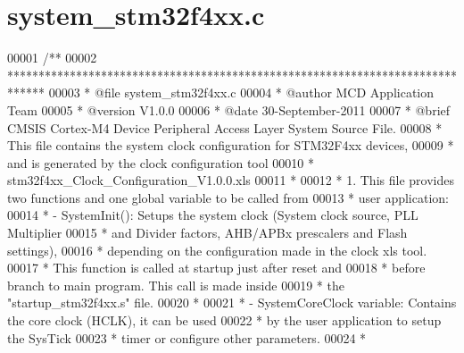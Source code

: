 \section{system\+\_\+stm32f4xx.\+c}
\label{system__stm32f4xx_8c_source}

\begin{DoxyCode}
00001 \textcolor{comment}{/**}
00002 \textcolor{comment}{  ******************************************************************************}
00003 \textcolor{comment}{  * @file    system\_stm32f4xx.c}
00004 \textcolor{comment}{  * @author  MCD Application Team}
00005 \textcolor{comment}{  * @version V1.0.0}
00006 \textcolor{comment}{  * @date    30-September-2011}
00007 \textcolor{comment}{  * @brief   CMSIS Cortex-M4 Device Peripheral Access Layer System Source File.}
00008 \textcolor{comment}{  *          This file contains the system clock configuration for STM32F4xx devices,}
00009 \textcolor{comment}{  *          and is generated by the clock configuration tool}
00010 \textcolor{comment}{  *          stm32f4xx\_Clock\_Configuration\_V1.0.0.xls}
00011 \textcolor{comment}{  *             }
00012 \textcolor{comment}{  * 1.  This file provides two functions and one global variable to be called from }
00013 \textcolor{comment}{  *     user application:}
00014 \textcolor{comment}{  *      - SystemInit(): Setups the system clock (System clock source, PLL Multiplier}
00015 \textcolor{comment}{  *                      and Divider factors, AHB/APBx prescalers and Flash settings),}
00016 \textcolor{comment}{  *                      depending on the configuration made in the clock xls tool. }
00017 \textcolor{comment}{  *                      This function is called at startup just after reset and }
00018 \textcolor{comment}{  *                      before branch to main program. This call is made inside}
00019 \textcolor{comment}{  *                      the "startup\_stm32f4xx.s" file.}
00020 \textcolor{comment}{  *}
00021 \textcolor{comment}{  *      - SystemCoreClock variable: Contains the core clock (HCLK), it can be used}
00022 \textcolor{comment}{  *                                  by the user application to setup the SysTick }
00023 \textcolor{comment}{  *                                  timer or configure other parameters.}
00024 \textcolor{comment}{  *                                     }

\end{DoxyCode}
